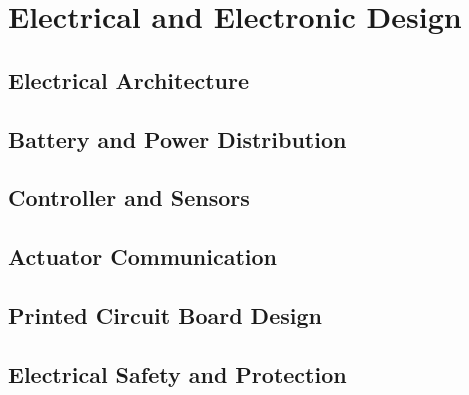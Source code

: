 \chapter{Electrical and Electronic Design}

\section{Electrical Architecture}

\section{Battery and Power Distribution}

\section{Controller and Sensors}

\section{Actuator Communication}

\section{Printed Circuit Board Design}

\section{Electrical Safety and Protection}
